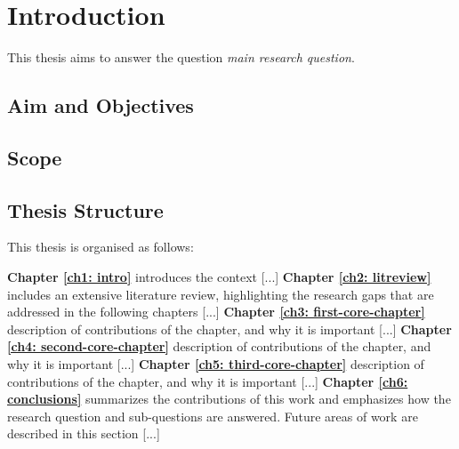 \chapter{\label{ch1: intro}Introduction} 
\minitoc
This thesis aims to answer the question \emph{main research question}.


\section{Aim and Objectives}


\section{Scope}


\section{Thesis Structure}
\noindent This thesis is organised as follows:

\textbf{Chapter \ref{ch1: intro}} introduces the context [...]
\textbf{Chapter \ref{ch2: litreview}} includes an extensive literature review, highlighting the research gaps that are addressed in the following chapters [...]
\textbf{Chapter \ref{ch3: first-core-chapter}} description of contributions of the chapter, and why it is important [...]
\textbf{Chapter \ref{ch4: second-core-chapter}} description of contributions of the chapter, and why it is important [...]
\textbf{Chapter \ref{ch5: third-core-chapter}} description of contributions of the chapter, and why it is important [...]
\textbf{Chapter \ref{ch6: conclusions}} summarizes the contributions of this work and emphasizes how the research question and sub-questions are answered. Future areas of work are described in this section [...]

